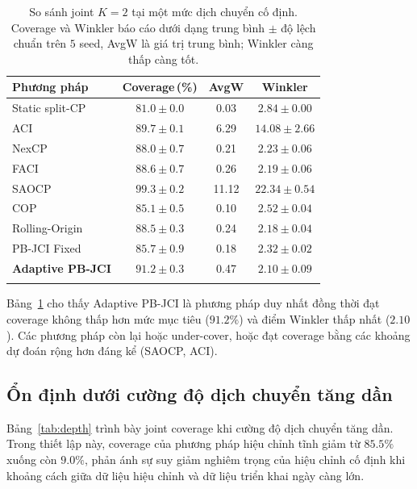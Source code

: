 \documentclass[pdflatex,sn-mathphys-num]{sn-jnl}
\begin{document}
\begin{table}[h]
\caption{So sánh joint $K{=}2$ tại một mức dịch chuyển cố định. Coverage và Winkler báo cáo dưới dạng trung
bình $\pm$ độ lệch chuẩn trên $5$ seed, AvgW là giá trị trung bình; Winkler càng thấp càng tốt.}\label{tab:main}
\begin{tabular}{@{}lccc@{}}
\toprule
Phương pháp & Coverage\,(\%) & AvgW & Winkler \\
\midrule
Static split-CP & $81.0 \pm 0.0$ & 0.03 & $2.84 \pm 0.00$ \\
ACI~\cite{gibbs2021adaptive} & $89.7 \pm 0.1$ & 6.29 & $14.08 \pm 2.66$ \\
NexCP~\cite{barber2023conformal} & $88.0 \pm 0.7$ & 0.21 & $2.23 \pm 0.06$ \\
FACI~\cite{gibbs2024conformal} & $88.6 \pm 0.7$ & 0.26 & $2.19 \pm 0.06$ \\
SAOCP~\cite{bhatnagar2023improved} & $99.3 \pm 0.2$ & 11.12 & $22.34 \pm 0.54$ \\
COP~\cite{hu2026conformal} & $85.1 \pm 0.5$ & 0.10 & $2.52 \pm 0.04$ \\
Rolling-Origin~\cite{halkiewicz2026rolling} & $88.5 \pm 0.3$ & 0.24 & $2.18 \pm 0.04$ \\
PB-JCI Fixed & $85.7 \pm 0.9$ & 0.18 & $2.32 \pm 0.02$ \\
\textbf{Adaptive PB-JCI} & $\mathbf{91.2 \pm 0.3}$ & 0.47 & $\mathbf{2.10 \pm 0.09}$ \\
\botrule
\end{tabular}
\end{table}

Bảng~\ref{tab:main} cho thấy Adaptive PB-JCI là phương pháp duy nhất đồng thời đạt coverage không thấp hơn
mức mục tiêu ($91.2\%$) và điểm Winkler thấp nhất ($2.10$). Các phương pháp còn lại hoặc under-cover, hoặc
đạt coverage bằng các khoảng dự đoán rộng hơn đáng kể (SAOCP, ACI).

\subsection{Ổn định dưới cường độ dịch chuyển tăng dần}
Bảng~\ref{tab:depth} trình bày joint coverage khi cường độ dịch chuyển tăng dần. Trong thiết lập này,
coverage của phương pháp hiệu chỉnh tĩnh giảm từ $85.5\%$ xuống còn $9.0\%$, phản ánh sự suy giảm nghiêm
trọng của hiệu chỉnh cố định khi khoảng cách giữa dữ liệu hiệu chỉnh và dữ liệu triển khai ngày càng lớn.
\end{document}
